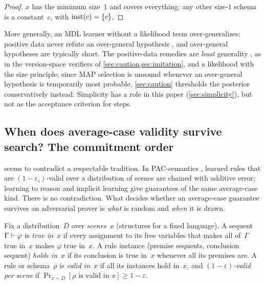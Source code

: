 \begin{proof}
$x$ has the minimum size~$1$ and covers everything; any other size-$1$ schema is a constant~$c$, with $\mathrm{inst}(c)=\{c\}$.
\end{proof}

More generally, an MDL learner without a likelihood term over-generalizes: positive data never refute an over-general hypothesis \citep{gold1967language,angluin1980inductive}, and over-general hypotheses are typically short. The positive-data remedies are \emph{least} generality \citep{plotkin1970note}, as in the version-space verifiers of \cref{sec:caution,sec:imitation}, and a likelihood with the size principle; since MAP selection is unsound whenever an over-general hypothesis is temporarily most probable, \cref{sec:caution} thresholds the posterior conservatively instead. Simplicity has a role in this paper (\cref{sec:simplicity}), but not as the acceptance criterion for steps.

\subsection{When does average-case validity survive search? The commitment order}\label{sec:search:commitment}

 seems to contradict a respectable tradition. In PAC-semantics \citep{valiant2000robust}, learned rules that are $(1-\varepsilon_i)$-valid over a distribution of scenes are chained with additive error; learning to reason \citep{khardon1997learning} and implicit learning \citep{juba2013implicit} give guarantees of the same average-case kind. There is no contradiction. What decides whether an average-case guarantee survives an adversarial prover is \emph{what} is random and \emph{when} it is drawn.

\begin{definition}\label{def:search:scene}
Fix a distribution~$D$ over \emph{scenes}~$x$ (structures for a fixed language). A sequent $\Gamma\vdash\varphi$ is \emph{true in}~$x$ if every assignment to its free variables that makes all of~$\Gamma$ true in~$x$ makes $\varphi$ true in~$x$. A rule instance (premise sequents, conclusion sequent) \emph{holds in}~$x$ if its conclusion is true in~$x$ whenever all its premises are. A rule or schema~$\rho$ is \emph{valid in}~$x$ if all its instances hold in~$x$, and \emph{$(1-\varepsilon)$-valid per scene} if $\Pr_{x\sim D}[\rho\text{ is valid in }x]\ge1-\varepsilon$.
\end{definition}

